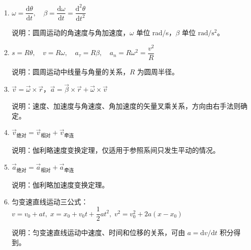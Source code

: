 \documentclass[12pt,a4paper]{ctexart}
\begin{document}
\begin{enumerate}[leftmargin=3em,label=\textbf{公式\arabic*}：,ref=公式\arabic*]
    说明：总加速度在自然坐标系中的分解表示，大小 $a=\sqrt{a_\tau^2+a_n^2}$。

    \item $\omega = \dfrac{\mathrm{d}\theta}{\mathrm{d}t},\quad \beta = \dfrac{\mathrm{d}\omega}{\mathrm{d}t} = \dfrac{\mathrm{d}^2\theta}{\mathrm{d}t^2}$

    说明：圆周运动的角速度与角加速度，$\omega$ 单位 rad/s，$\beta$ 单位 $\mathrm{rad}/\mathrm{s}^2$。

    \item $s = R\theta,\quad v = R\omega,\quad a_\tau = R\beta,\quad a_n = R\omega^2 = \dfrac{v^2}{R}$

    说明：圆周运动中线量与角量的关系，$R$ 为圆周半径。

    \item $\vec{v} = \vec{\omega}\times\vec{r}$，$\vec{a} = \vec{\beta}\times\vec{r} + \vec{\omega}\times\vec{v}$

    说明：速度、加速度与角速度、角加速度的矢量叉乘关系，方向由右手法则确定。

    \item $\vec{v}_{\text{绝对}} = \vec{v}_{\text{相对}} + \vec{v}_{\text{牵连}}$

    说明：伽利略速度变换定理，仅适用于参照系间只发生平动的情况。

    \item $\vec{a}_{\text{绝对}} = \vec{a}_{\text{相对}} + \vec{a}_{\text{牵连}}$

    说明：伽利略加速度变换定理。

    \item 匀变速直线运动三公式：$v = v_0 + at,\; x = x_0 + v_0 t + \dfrac{1}{2}at^2,\; v^2 = v_0^2 + 2a(x-x_0)$

    说明：匀变速直线运动中速度、时间和位移的关系，可由 $a=\mathrm{d}v/\mathrm{d}t$ 积分得到。

\end{enumerate}
\end{document}
